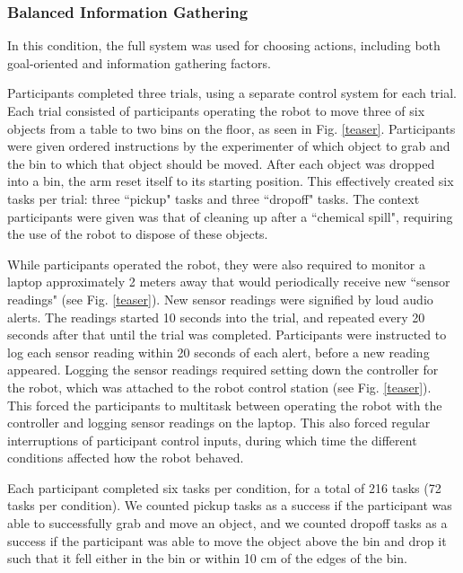 \documentclass[conference]{IEEEtran}
\begin{document}
\subsubsection{Balanced Information Gathering}
In this condition, the full system was used for choosing actions, including both goal-oriented and information gathering factors.

Participants completed three trials, using a separate control system for each trial. Each trial consisted of participants operating the robot to move three of six objects from a table to two bins on the floor, as seen in Fig. \ref{teaser}. Participants were given ordered instructions by the experimenter of which object to grab and the bin to which that object should be moved. After each object was dropped into a bin, the arm reset itself to its starting position. This effectively created six tasks per trial: three ``pickup" tasks and three ``dropoff" tasks. The context participants were given was that of cleaning up after a ``chemical spill", requiring the use of the robot to dispose of these objects.

While participants operated the robot, they were also required to monitor a laptop approximately 2 meters away that would periodically receive new ``sensor readings" (see Fig. \ref{teaser}). New sensor readings were signified by loud audio alerts. The readings started 10 seconds into the trial, and repeated every 20 seconds after that until the trial was completed. Participants were instructed to log each sensor reading within 20 seconds of each alert, before a new reading appeared. Logging the sensor readings required setting down the controller for the robot, which was attached to the robot control station (see Fig. \ref{teaser}). This forced the participants to multitask between operating the robot with the controller and logging sensor readings on the laptop. This also forced regular interruptions of participant control inputs, during which time the different conditions affected how the robot behaved. 

Each participant completed six tasks per condition, for a total of 216 tasks (72 tasks per condition). We counted pickup tasks as a success if the participant was able to successfully grab and move an object, and we counted dropoff tasks as a success if the participant was able to move the object above the bin and drop it such that it fell either in the bin or within 10 cm of the edges of the bin.
\end{document}
